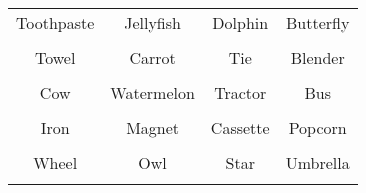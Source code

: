 \documentclass[12pt,a4paper]{article}
\begin{document}
\thispagestyle{empty}
\begin{table}[]
\centering
\Huge
\begin{tabular}{cccc}
 Toothpaste& Jellyfish& Dolphin& Butterfly\\  & & & \\
 Towel& Carrot& Tie& Blender\\  & & & \\
 Cow& Watermelon& Tractor& Bus\\  & & & \\
 Iron& Magnet& Cassette& Popcorn\\  & & & \\
 Wheel& Owl& Star& Umbrella\\  & & & \\
\end{tabular}
\end{table}
\end{document}
